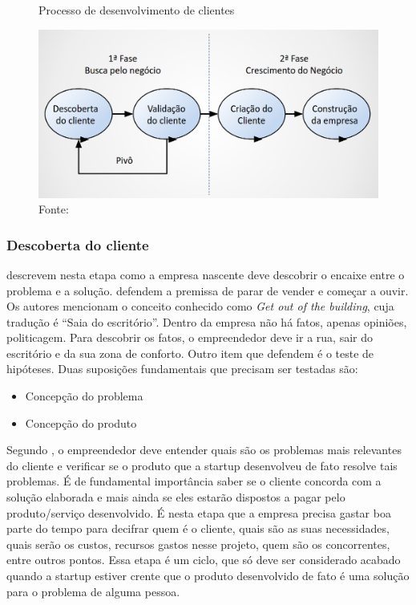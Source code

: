\begin{figure}[H]
\caption{Processo de desenvolvimento de clientes}
\centerline{\includegraphics[scale=0.3]{img/desenvolvimento_de_clientes}}
\label{fig:desenvolvimento_de_clientes}
\caption* {Fonte: }
\end{figure}

\subsubsection{Descoberta do cliente}
\label{cha:descoberta_do_cliente}
 descrevem nesta etapa como a empresa nascente deve descobrir o encaixe entre o problema e a solução.
 defendem a premissa de parar de vender e começar a ouvir. Os autores mencionam o conceito conhecido como \textit{Get out of the building}, cuja tradução é \enquote{Saia do escritório}. Dentro da empresa não há fatos, apenas opiniões, politicagem. Para descobrir os fatos, o empreendedor deve ir a rua, sair do escritório e da sua zona de conforto.
Outro item que  defendem é o teste de hipóteses. Duas suposições fundamentais que precisam ser testadas são: 
\begin{itemize}
\item Concepção do problema
\item Concepção do produto
\end{itemize}

Segundo , o empreendedor deve entender quais são os problemas mais relevantes do cliente e verificar se o produto que a startup desenvolveu de fato resolve tais problemas. É de fundamental importância saber se o cliente concorda com a solução elaborada e mais ainda se eles estarão dispostos a pagar pelo produto/serviço desenvolvido. É nesta etapa que a empresa precisa gastar boa parte do tempo para decifrar quem é o cliente, quais são as suas necessidades, quais serão os custos, recursos gastos nesse projeto, quem são os concorrentes, entre outros pontos. Essa etapa é um ciclo, que só deve ser considerado acabado quando a startup estiver crente que o produto desenvolvido de fato é uma solução para o problema de alguma pessoa.

